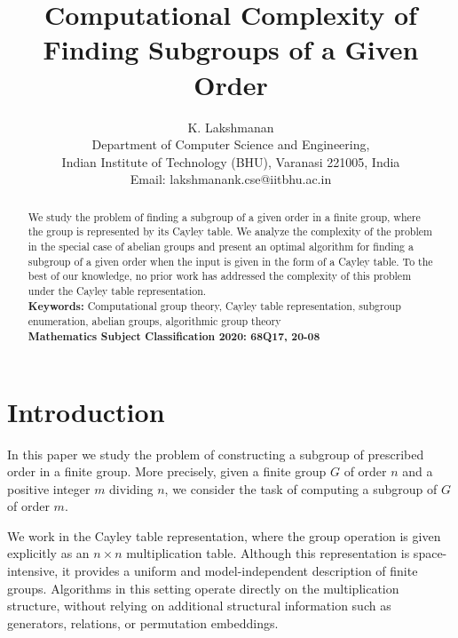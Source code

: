 \documentclass[11pt]{article}
\begin{document}
	
	\title{Computational Complexity of Finding Subgroups of a Given Order}
	
	
	\author{K. Lakshmanan \\
		Department of Computer Science and Engineering, \\ Indian Institute of Technology (BHU), Varanasi 221005, India\\
		Email: lakshmanank.cse@iitbhu.ac.in}
	
	\date{}
	
	\maketitle
	
	\begin{abstract}
		We study the problem of finding a subgroup of a given order in a finite group, where the group is represented by its Cayley table. We analyze the complexity of the problem in the special case of abelian groups and present an optimal algorithm for finding a subgroup of a given order when the input is given in the form of a Cayley table. To the best of our knowledge, no prior work has addressed the complexity of this problem under the Cayley table representation.\\
		\textbf{Keywords: } Computational group theory, Cayley table representation, subgroup enumeration, abelian groups, algorithmic group theory \\
		\textbf{Mathematics Subject Classification 2020: 68Q17, 20-08 }	
	\end{abstract}
	
	\section{Introduction}
	
	In this paper we study the problem of constructing a subgroup of prescribed
	order in a finite group.
	More precisely, given a finite group $G$ of order $n$
	and a positive integer $m$ dividing $n$,
	we consider the task of computing a subgroup of $G$ of order $m$.
	
	We work in the Cayley table representation,
	where the group operation is given explicitly as an $n \times n$ multiplication table.
	Although this representation is space-intensive,
	it provides a uniform and model-independent description of finite groups.
	Algorithms in this setting operate directly on the multiplication structure,
	without relying on additional structural information such as generators,
	relations, or permutation embeddings.
	
\end{document}
